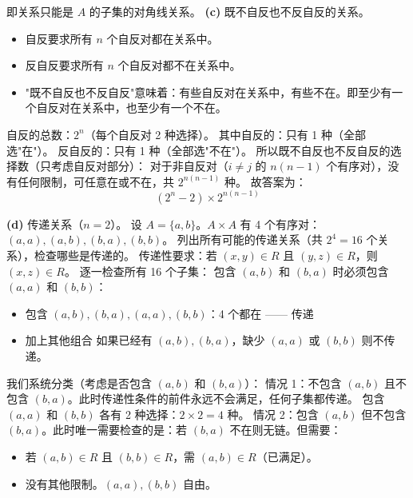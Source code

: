 \documentclass[10pt,a4paper,openany]{ctexbook}
\theoremstyle{definition}
\theoremstyle{remark}
\begin{document}
即关系只能是 $A$ 的子集的对角线关系。
\textbf{(c)} 既不自反也不反自反的关系。
\begin{itemize}
\item 自反要求所有 $n$ 个自反对都在关系中。
\item 反自反要求所有 $n$ 个自反对都不在关系中。
\item "既不自反也不反自反"意味着：有些自反对在关系中，有些不在。即至少有一个自反对在关系中，也至少有一个不在。

\end{itemize}

自反的总数：$2^n$（每个自反对 2 种选择）。
其中自反的：只有 1 种（全部选"在"）。
反自反的：只有 1 种（全部选"不在"）。
所以既不自反也不反自反的选择数（只考虑自反对部分）：
对于非自反对（$i \neq j$ 的 $n(n-1)$ 个有序对），没有任何限制，可任意在或不在，共 $2^{n(n-1)}$ 种。
故答案为：
\[
(2^n - 2) \times 2^{n(n-1)}
\]

\textbf{(d)} 传递关系（$n=2$）。
设 $A = \{a, b\}$。$A \times A$ 有 4 个有序对：$(a,a), (a,b), (b,a), (b,b)$。
列出所有可能的传递关系（共 $2^4 = 16$ 个关系），检查哪些是传递的。
传递性要求：若 $(x,y) \in R$ 且 $(y,z) \in R$，则 $(x,z) \in R$。
逐一检查所有 16 个子集：
包含 $(a,b)$ 和 $(b,a)$ 时必须包含 $(a,a)$ 和 $(b,b)$：
\begin{itemize}
\item 包含 $(a,b),(b,a),(a,a),(b,b)$：4 个都在 —— 传递
\item 加上其他组合
如果已经有 $(a,b),(b,a)$，缺少 $(a,a)$ 或 $(b,b)$ 则不传递。


\end{itemize}

我们系统分类（考虑是否包含 $(a,b)$ 和 $(b,a)$）：
情况 1：不包含 $(a,b)$ 且不包含 $(b,a)$。此时传递性条件的前件永远不会满足，任何子集都传递。
包含 $(a,a)$ 和 $(b,b)$ 各有 2 种选择：$2 \times 2 = 4$ 种。
情况 2：包含 $(a,b)$ 但不包含 $(b,a)$。此时唯一需要检查的是：若 $(b,a)$ 不在则无链。但需要：
\begin{itemize}
\item 若 $(a,b) \in R$ 且 $(b,b) \in R$，需 $(a,b) \in R$（已满足）。
\item 没有其他限制。$(a,a), (b,b)$ 自由。
\end{itemize}
\end{document}
